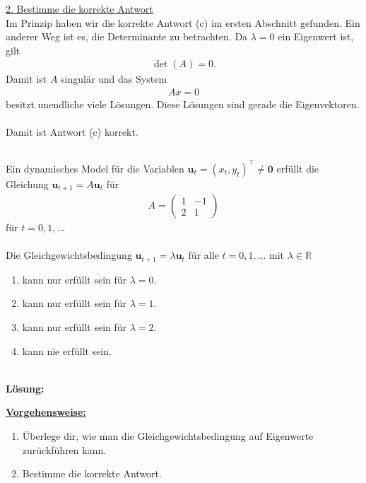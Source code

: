 \underline{2. Bestimme die korrekte Antwort}\\
Im Prinzip haben wir die korrekte Antwort (c) im ersten Abschnitt gefunden.
Ein anderer Weg ist es, die Determinante zu betrachten.
Da $\lambda = 0 $ ein Eigenwert ist, gilt
\begin{align*}
\det(A) = 0.
\end{align*}
Damit ist $A$ singulär und das System
\begin{align*}
A x = 0
\end{align*}
besitzt unendliche viele Lösungen.
Diese Lösungen sind gerade die Eigenvektoren.\\
\\
Damit ist Antwort (c) korrekt.

\newpage

\subsection*{}
Ein dynamisches Model für die Variablen $\textbf{u}_t = (x_t , y_t)^\top \neq \textbf{0}$ erfüllt die Gleichung
$\textbf{u}_{t+1} = A \textbf{u}_t$ für
\begin{align*}
A = 
\begin{pmatrix}
1 & -1\\
2 & 1
\end{pmatrix}
\end{align*}
für $t = 0,1,\dots$ \\
\\
Die Gleichgewichtsbedingung $\textbf{u}_{t+1} = \lambda \textbf{u}_t$ für alle $t = 0,1,\dots$ mit $\lambda \in \mathbb{R}$
\renewcommand{\labelenumi}{(\alph{enumi})}
\begin{enumerate}
\item 
kann nur erfüllt sein für $\lambda = 0$.
\item
kann nur erfüllt sein für $\lambda = 1$.
\item
kann nur erfüllt sein für $\lambda = 2$.
\item
kann nie erfüllt sein.
\end{enumerate}
\ \\
\textbf{Lösung:}
\begin{mdframed}
\underline{\textbf{Vorgehensweise:}}
\renewcommand{\labelenumi}{\theenumi.}
\begin{enumerate}
\item Überlege dir, wie man die Gleichgewichtsbedingung auf Eigenwerte zurückführen kann.
\item
Bestimme die korrekte Antwort.
\end{enumerate}
\end{mdframed}

